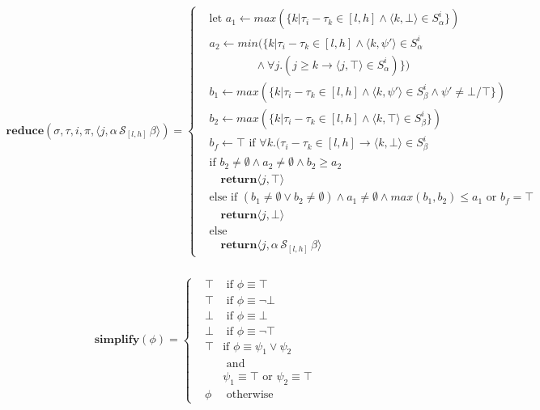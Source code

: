 \documentclass[10pt,a4paper]{article}
\newcommand{\rp}[2]{\ensuremath{\langle #1, #2 \rangle}}
\begin{document}
\begin{align*}
\mathbf{reduce}(\sigma,\tau, i,\pi,\rp{j}{\alpha\, \mathcal{S}_{[l,h]}\, \beta}) = \left\{
\begin{aligned}
&\text{let } a_1 \leftarrow max(\{k | \tau_i - \tau_k \in [l, h] \wedge \rp{k}{\bot} \in S^i_{\alpha} \}) \\
&a_2 \leftarrow min(\{k | \tau_i - \tau_k \in [l, h] \wedge \rp{k}{\psi'} \in S^i_{\alpha} \\
&\quad \quad \quad \quad \wedge \forall j. (j \geq k \rightarrow \rp{j}{\top} \in S^i_{\alpha}) \}) \\
&b_1 \leftarrow max(\{k | \tau_i - \tau_k \in [l, h] \wedge \rp{k}{\psi'} \in S^i_{\beta} \wedge \psi' \neq \bot/\top \}) \\
&b_2 \leftarrow max(\{k | \tau_i - \tau_k \in [l, h] \wedge \rp{k}{\top} \in S^i_{\beta} \}) \\
&b_f \leftarrow \top \text{ if } \forall k.(\tau_i-\tau_k \in [l,h] \rightarrow \rp{k}{\bot} \in S^i_{\beta} \\
&\text{if } b_2 \neq \emptyset \wedge a_2 \neq \emptyset \wedge b_2 \geq a_2 \\
& \quad\mathbf{return} \rp{j}{\top} \\
&\text{else if } (b_1 \neq \emptyset \vee b_2 \neq \emptyset) \wedge a_1 \neq \emptyset \wedge max(b_1,b_2) \leq a_1 \text{ or } b_f = \top\\
& \quad\mathbf{return} \rp{j}{\bot} \\
&\text{else} \\
& \quad\mathbf{return} \rp{j}{\alpha\, \mathcal{S}_{[l,h]}\, \beta}
\end{aligned} \right. \\
\end{align*}

\begin{align*}
\mathbf{simplify}(\phi) = \left\{
\begin{aligned}
&\top &\text{ if } \phi \equiv \top \\
&\top &\text{ if } \phi \equiv \neg \bot \\
&\bot &\text{ if } \phi \equiv \bot \\
&\bot &\text{ if } \phi \equiv \neg \top \\
&\top &\text {if } \phi \equiv \psi_1 \vee \psi_2 \\
& &\text{ and } \\ & & \psi_1 \equiv \top \text{ or } \psi_2 \equiv \top \\
&\phi &\text{ otherwise}
\end{aligned} \right. \\
\end{align*}
\end{document}

